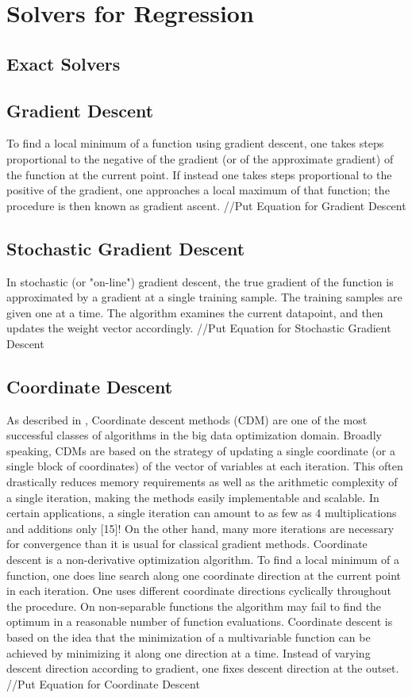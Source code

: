 \documentclass{sigplanconf}
\begin{document}
\section{Solvers for Regression}
\subsection{Exact Solvers}

\subsection{Gradient Descent}
To find a local minimum of a function using gradient descent, one takes steps proportional to the negative of 
the gradient (or of the approximate gradient) of the function at the current point. If instead one takes steps 
proportional to the positive of the gradient, one approaches a local maximum of that function; 
the procedure is then known as gradient ascent.
//Put Equation for Gradient Descent

\subsection{Stochastic Gradient Descent}
In stochastic (or "on-line") gradient descent, the true gradient of the function is approximated by a gradient at a
single training sample. The training samples are given one at a time. The algorithm examines the
current datapoint, and then updates the weight vector accordingly.
//Put Equation for Stochastic Gradient Descent

\subsection{Coordinate Descent}
As described in \cite{fried1}, Coordinate descent methods (CDM) are one of the most successful classes of algorithms in the big data optimization domain. 
Broadly speaking, CDMs are based on the strategy of updating a single coordinate (or a single block of coordinates) of the vector
of variables at each iteration. This often drastically reduces memory requirements as well as the
arithmetic complexity of a single iteration, making the methods easily implementable and scalable.
In certain applications, a single iteration can amount to as few as 4 multiplications and additions
only [15]! On the other hand, many more iterations are necessary for convergence than it is usual
for classical gradient methods.
Coordinate descent is a non-derivative optimization algorithm. To find a local minimum of a function, one does line 
search along one coordinate direction at the current point in each iteration. One uses different coordinate directions 
cyclically throughout the procedure. On non-separable functions the algorithm may fail to find the optimum in a reasonable 
number of function evaluations. Coordinate descent is based on the idea that the minimization of a multivariable function can be
achieved by minimizing it along one direction at a time. Instead of varying descent direction according
to gradient, one fixes descent direction at the outset.
//Put Equation for Coordinate Descent
\end{document}
